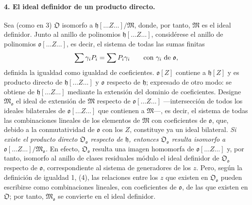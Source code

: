 \paragraph{4. El ideal definidor de un producto directo.}
Sea (como en 3) $\mathfrak O$ isomorfo a $\mathfrak h[\ldots Z\ldots]/\mathfrak M$, donde, por tanto, $\mathfrak M$ es el ideal definidor. Junto al anillo de polinomios $\mathfrak h[\ldots Z\ldots]$, considérese el anillo de polinomios $\mathfrak o[\ldots Z\ldots]$, es decir, el sistema de todas las sumas finitas
\[
\sum \gamma_iP_i=\sum P_i\gamma_i
\qquad\hbox{con }\gamma_i\hbox{ de }\mathfrak o,
\]
definida la igualdad como igualdad de coeficientes. $\mathfrak o[Z]$ contiene a $\mathfrak h[Z]$ y es producto directo de $\mathfrak h[\ldots Z\ldots]$ y $\mathfrak o$ respecto de $\mathfrak h$; expresado de otro modo: se obtiene de $\mathfrak h[\ldots Z\ldots]$ mediante la extensión del dominio de coeficientes. Designe $\mathfrak M_{\mathfrak o}$ el ideal de extensión de $\mathfrak M$ respecto de $\mathfrak o[\ldots Z\ldots]$ ---intersección de todos los ideales bilaterales de $\mathfrak o[\ldots Z\ldots]$ que contienen a $\mathfrak M$---, es decir, el sistema de todas las combinaciones lineales de los elementos de $\mathfrak M$ con coeficientes de $\mathfrak o$, que, debido a la conmutatividad de $\mathfrak o$ con los $Z$, constituye ya un ideal bilateral. \emph{Si existe el producto directo $\mathfrak O_{\mathfrak o}$ respecto de $\mathfrak h$, entonces $\mathfrak O_{\mathfrak o}$ resulta isomorfo a $\mathfrak o[\ldots Z\ldots]/\mathfrak M_{\mathfrak o}$.} En efecto, $\mathfrak O_{\mathfrak o}$ resulta una imagen homomorfa de $\mathfrak o[\ldots Z\ldots]$ y, por tanto, isomorfo al anillo de clases residuales módulo el ideal definidor de $\mathfrak O_{\mathfrak o}$ respecto de $\mathfrak o$, correspondiente al sistema de generadores de los $z$. Pero, según la definición de igualdad 1, (4), las relaciones entre los $z$ que existen en $\mathfrak O_{\mathfrak o}$ pueden escribirse como combinaciones lineales, con coeficientes de $\mathfrak o$, de las que existen en $\mathfrak O$; por tanto, $\mathfrak M_{\mathfrak o}$ se convierte en el ideal definidor.

